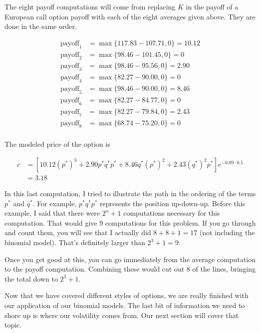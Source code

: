 \documentclass{ximera}
\begin{document}
\begin{solution}
The eight payoff computations will come from replacing $K$ in the payoff of a European call option payoff with each of the eight averages given above. They are done in the same order.

	\begin{align*}
	\text{payoff}_1 	&=\max\{117.83-107.71,0\}=10.12\\
	\text{payoff}_2 	&=\max\{98.46-101.45,0\}=0\\
	\text{payoff}_3 	&=\max\{98.46-95.56,0\}=2.90\\
	\text{payoff}_4 	&=\max\{82.27-90.00,0\}=0\\
	\text{payoff}_5 	&=\max\{98.46-90.00,0\}=8.46\\
	\text{payoff}_6 	&=\max\{82.27-84.77,0\}=0\\
	\text{payoff}_7 	&=\max\{82.27-79.84,0\}=2.43\\
	\text{payoff}_8 	&=\max\{68.74-75.20,0\}=0\\
	\end{align*}

The modeled price of the option is

	\begin{align*}
	c 	&=[10.12(p^*)^3+2.90p^*q^*p^*+8.46q^*(p^*)^2+2.43(q^*)^2p^*]e^{-0.09\cdot 0.5}\\
		&=3.18
	\end{align*}

In this last computation, I tried to illustrate the path in the ordering of the terms $p^*$ and $q^*$. For example, $p^*q^*p^*$ represents the position up-down-up. Before this example, I said that there were $2^n+1$ computations necessary for this computation. That would give 9 computations for this problem. If you go through and count them, you will see that I actually did $8+8+1=17$ (not including the binomial model). That's definitely larger than $2^3+1=9$. 

Once you get good at this, you can go immediately from the average computation to the payoff computation. Combining these would cut out 8 of the lines, bringing the total down to $2^3+1$.
\end{solution}

Now that we have covered different styles of options, we are really finished with our application of our binomial models. The last bit of information we need to shore up is where our volatility comes from. Our next section will cover that topic.
\end{document}
